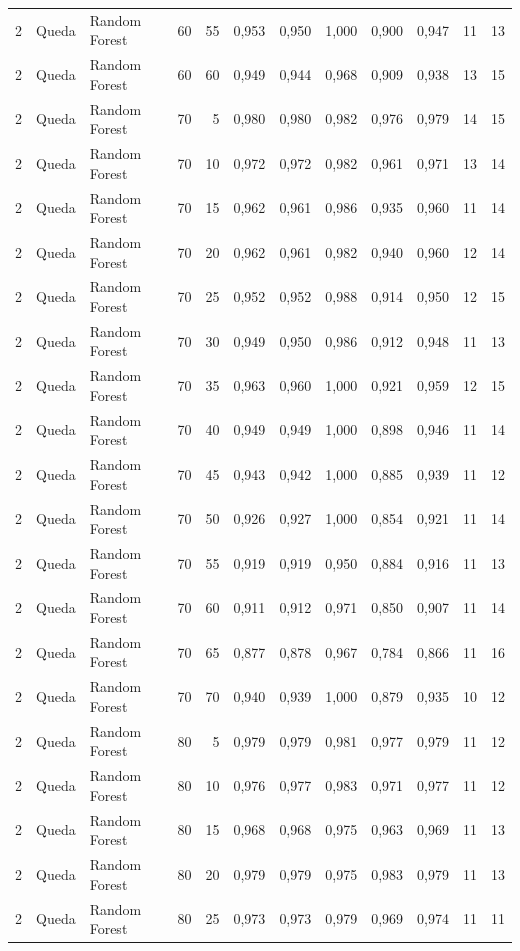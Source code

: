 \begin{longtable}{@{}rllrrrrrrrrr@{}}
2 & Queda & Random Forest & 60 & 55 & 0,953 & 0,950 & 1,000 & 0,900 & 0,947 & 11 & 13 \\
2 & Queda & Random Forest & 60 & 60 & 0,949 & 0,944 & 0,968 & 0,909 & 0,938 & 13 & 15 \\
2 & Queda & Random Forest & 70 & 5 & 0,980 & 0,980 & 0,982 & 0,976 & 0,979 & 14 & 15 \\
2 & Queda & Random Forest & 70 & 10 & 0,972 & 0,972 & 0,982 & 0,961 & 0,971 & 13 & 14 \\
2 & Queda & Random Forest & 70 & 15 & 0,962 & 0,961 & 0,986 & 0,935 & 0,960 & 11 & 14 \\
2 & Queda & Random Forest & 70 & 20 & 0,962 & 0,961 & 0,982 & 0,940 & 0,960 & 12 & 14 \\
2 & Queda & Random Forest & 70 & 25 & 0,952 & 0,952 & 0,988 & 0,914 & 0,950 & 12 & 15 \\
2 & Queda & Random Forest & 70 & 30 & 0,949 & 0,950 & 0,986 & 0,912 & 0,948 & 11 & 13 \\
2 & Queda & Random Forest & 70 & 35 & 0,963 & 0,960 & 1,000 & 0,921 & 0,959 & 12 & 15 \\
2 & Queda & Random Forest & 70 & 40 & 0,949 & 0,949 & 1,000 & 0,898 & 0,946 & 11 & 14 \\
2 & Queda & Random Forest & 70 & 45 & 0,943 & 0,942 & 1,000 & 0,885 & 0,939 & 11 & 12 \\
2 & Queda & Random Forest & 70 & 50 & 0,926 & 0,927 & 1,000 & 0,854 & 0,921 & 11 & 14 \\
2 & Queda & Random Forest & 70 & 55 & 0,919 & 0,919 & 0,950 & 0,884 & 0,916 & 11 & 13 \\
2 & Queda & Random Forest & 70 & 60 & 0,911 & 0,912 & 0,971 & 0,850 & 0,907 & 11 & 14 \\
2 & Queda & Random Forest & 70 & 65 & 0,877 & 0,878 & 0,967 & 0,784 & 0,866 & 11 & 16 \\
2 & Queda & Random Forest & 70 & 70 & 0,940 & 0,939 & 1,000 & 0,879 & 0,935 & 10 & 12 \\
2 & Queda & Random Forest & 80 & 5 & 0,979 & 0,979 & 0,981 & 0,977 & 0,979 & 11 & 12 \\
2 & Queda & Random Forest & 80 & 10 & 0,976 & 0,977 & 0,983 & 0,971 & 0,977 & 11 & 12 \\
2 & Queda & Random Forest & 80 & 15 & 0,968 & 0,968 & 0,975 & 0,963 & 0,969 & 11 & 13 \\
2 & Queda & Random Forest & 80 & 20 & 0,979 & 0,979 & 0,975 & 0,983 & 0,979 & 11 & 13 \\
2 & Queda & Random Forest & 80 & 25 & 0,973 & 0,973 & 0,979 & 0,969 & 0,974 & 11 & 11 \\

\end{longtable}
